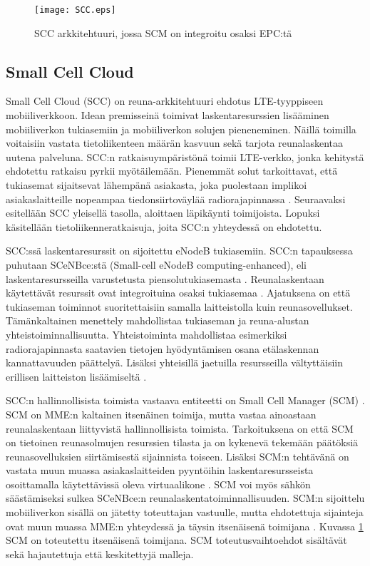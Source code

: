 \begin{figure}[tb]
\texttt{[image: SCC.eps]}
\caption{SCC arkkitehtuuri, jossa SCM on integroitu osaksi EPC:tä \cite{lobillo15scc} } \label{fig:scc}
\end{figure}

\subsection{Small Cell Cloud} \label{scc}

Small Cell Cloud (SCC) on reuna-arkkitehtuuri ehdotus LTE-tyyppiseen mobiiliverkkoon.
Idean premisseinä toimivat laskentaresurssien lisääminen mobiiliverkon tukiasemiin ja mobiiliverkon solujen pieneneminen.
Näillä toimilla voitaisiin vastata tietoliikenteen määrän kasvuun sekä tarjota reunalaskentaa uutena palveluna.
SCC:n ratkaisuympäristönä toimii LTE-verkko, jonka kehitystä ehdotettu ratkaisu pyrkii myötäilemään.
Pienemmät solut tarkoittavat, että tukiasemat sijaitsevat lähempänä asiakasta, joka puolestaan implikoi asiakaslaitteille nopeampaa tiedonsiirtoväylää radiorajapinnassa \cite{lobillo15scc}.
Seuraavaksi esitellään SCC yleisellä tasolla, aloittaen läpikäynti toimijoista. Lopuksi käsitellään tietoliikenneratkaisuja, joita SCC:n yhteydessä on ehdotettu.

SCC:ssä laskentaresurssit on sijoitettu eNodeB tukiasemiin. SCC:n tapauksessa puhutaan SCeNBce:stä (Small-cell eNodeB computing-enhanced), eli laskentaresursseilla varustetusta piensolutukiasemasta \cite{lobillo15scc}.
Reunalaskentaan käytettävät resurssit ovat integroituina osaksi tukiasemaa \cite{puente15seamless}.
Ajatuksena on että tukiaseman toiminnot suoritettaisiin samalla laitteistolla kuin reunasovellukset.
Tämänkaltainen menettely mahdollistaa tukiaseman ja reuna-alustan yhteistoiminnallisuutta.
Yhteistoiminta mahdollistaa esimerkiksi radiorajapinnasta saatavien tietojen hyödyntämisen osana etälaskennan kannattavuuden päättelyä.
Lisäksi yhteisillä jaetuilla resursseilla vältyttäisiin erillisen laitteiston lisäämiseltä \cite{puente15seamless}.

SCC:n hallinnollisista toimista vastaava entiteetti on Small Cell Manager (SCM) \cite{lobillo15scc}.
SCM on MME:n kaltainen itsenäinen toimija, mutta vastaa ainoastaan reunalaskentaan liittyvistä hallinnollisista toimista.
Tarkoituksena on että SCM on tietoinen reunasolmujen resurssien tilasta ja on kykenevä tekemään päätöksiä reunasovelluksien siirtämisestä sijainnista toiseen. 
Lisäksi SCM:n tehtävänä on vastata muun muassa asiakaslaitteiden pyyntöihin laskentaresursseista osoittamalla käytettävissä oleva virtuaalikone \cite{dolezal2016performance}.
SCM voi myös sähkön säästämiseksi sulkea SCeNBce:n reunalaskentatoiminnallisuuden.
SCM:n sijoittelu mobiiliverkon sisällä on jätetty toteuttajan vastuulle, mutta ehdotettuja sijainteja ovat muun muassa MME:n yhteydessä ja täysin itsenäisenä toimijana \cite{lobillo15scc}.
Kuvassa \ref{fig:scc} SCM on toteutettu itsenäisenä toimijana.
SCM toteutusvaihtoehdot sisältävät sekä hajautettuja että keskitettyjä malleja.

